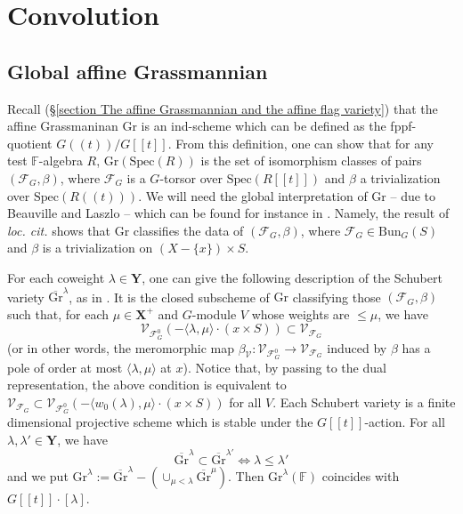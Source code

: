 \documentclass[11pt]{amsart}
\theoremstyle{plain}
\theoremstyle{remark}
\numberwithin{equation}{section}
\begin{document}
	\section{Convolution}
	\subsection{Global affine Grassmannian }
	Recall (§\ref{section The affine Grassmannian and the affine flag variety}) that the affine Grassmaninan $\mathrm{Gr}$ is an ind-scheme which can be defined as the fppf-quotient $G((t))/G[[t]]$. From this definition, one can show that for any test $\mathbb{F}$-algebra $R$, $\mathrm{Gr}(\mathrm{Spec}(R))$ is the set of isomorphism classes of pairs $(\mathcal{F}_G,\beta)$, where $\mathcal{F}_G$ is a $G$-torsor over $\mathrm{Spec}(R[[t]])$ and $\beta$ a trivialization over $\mathrm{Spec}(R((t)))$.  We will need the global interpretation of $\mathrm{Gr}$ -- due to Beauville and Laszlo \cite{BL} -- which can be found for instance in \cite[§1.4]{zhu2016introduction}. Namely, the result of \textit{loc. cit.} shows that $\mathrm{Gr}$ classifies the data of $(\mathcal{F}_G,\beta)$, where $\mathcal{F}_G\in\mathrm{Bun}_G(S)$ and $\beta$ is a trivialization on $(X-\{x\})\times S$. 
	
	For each coweight $\lambda\in\mathbf{Y}$, one can give the following description of the Schubert variety $\overline{\mathrm{Gr}}^\lambda$, as in \cite[§3.2.1]{BG}. It is the closed subscheme of $\mathrm{Gr}$ classifying those $(\mathcal{F}_G,\beta)$ such that, for each $\mu\in\mathbf{X}^+$ and $G$-module $V$ whose weights are $\leq\mu$, we have
	$$\mathcal{V}_{\mathcal{F}^0_G}(-\langle\lambda,\mu\rangle\cdot(x\times S))\subset \mathcal{V}_{\mathcal{F}_G} $$
	(or in other words, the meromorphic map $\beta_\mathcal{V}:\mathcal{V}_{\mathcal{F}^0_G}\to \mathcal{V}_{\mathcal{F}_G}$ induced by $\beta$ has a pole of order at most $\langle\lambda,\mu\rangle$ at $x$). Notice that, by passing to the dual representation, the above condition is equivalent to $\mathcal{V}_{\mathcal{F}_G}\subset \mathcal{V}_{\mathcal{F}^0_G}(-\langle w_0(\lambda),\mu\rangle\cdot(x\times S))$ for all $V$. Each Schubert variety is a finite dimensional projective scheme which is stable under the $G[[t]]$-action. For all $\lambda,\lambda'\in \mathbf{Y}$, we have
	$$\overline{\mathrm{Gr}}^\lambda\subset\overline{\mathrm{Gr}}^{\lambda'}\Longleftrightarrow \lambda\leq\lambda' $$
	and we put $\mathrm{Gr}^\lambda:=\overline{\mathrm{Gr}}^\lambda-(\cup_{\mu<\lambda}\overline{\mathrm{Gr}}^\mu)$. Then $\mathrm{Gr}^\lambda(\mathbb{F})$ coincides with $G[[t]]\cdot [\lambda]$.
\end{document}
